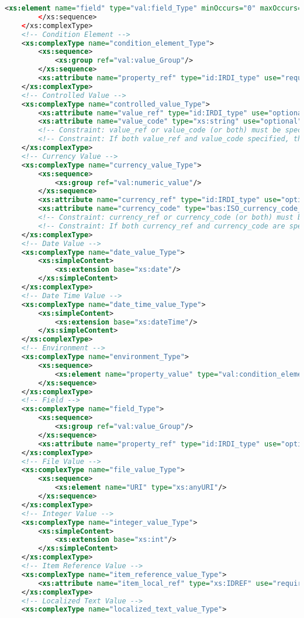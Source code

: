 \begin{lstlisting}[caption=value.xsd, language=XML, label=lst:value_xsd]
			<xs:element name="field" type="val:field_Type" minOccurs="0" maxOccurs="unbounded"/>
		</xs:sequence>
	</xs:complexType>
	<!-- Condition Element -->
	<xs:complexType name="condition_element_Type">
		<xs:sequence>
			<xs:group ref="val:value_Group"/>
		</xs:sequence>
		<xs:attribute name="property_ref" type="id:IRDI_type" use="required"/>
	</xs:complexType>
	<!-- Controlled Value -->
	<xs:complexType name="controlled_value_Type">
		<xs:attribute name="value_ref" type="id:IRDI_type" use="optional"/>
		<xs:attribute name="value_code" type="xs:string" use="optional"/>
		<!-- Constraint: value_ref or value_code (or both) must be specified. -->
		<!-- Constraint: If both value_ref and value_code specified, they must denote the same concept. -->
	</xs:complexType>
	<!-- Currency Value -->
	<xs:complexType name="currency_value_Type">
		<xs:sequence>
			<xs:group ref="val:numeric_value"/>
		</xs:sequence>
		<xs:attribute name="currency_ref" type="id:IRDI_type" use="optional"/>
		<xs:attribute name="currency_code" type="bas:ISO_currency_code_Type" use="optional"/>
		<!-- Constraint: currency_ref or currency_code (or both) must be specified. -->
		<!-- Constraint: If both currency_ref and currency_code are specified, they must denote the same concept. -->
	</xs:complexType>
	<!-- Date Value -->
	<xs:complexType name="date_value_Type">
		<xs:simpleContent>
			<xs:extension base="xs:date"/>
		</xs:simpleContent>
	</xs:complexType>
	<!-- Date Time Value -->
	<xs:complexType name="date_time_value_Type">
		<xs:simpleContent>
			<xs:extension base="xs:dateTime"/>
		</xs:simpleContent>
	</xs:complexType>
	<!-- Environment -->
	<xs:complexType name="environment_Type">
		<xs:sequence>
			<xs:element name="property_value" type="val:condition_element_Type" maxOccurs="unbounded"/>
		</xs:sequence>
	</xs:complexType>
	<!-- Field -->
	<xs:complexType name="field_Type">
		<xs:sequence>
			<xs:group ref="val:value_Group"/>
		</xs:sequence>
		<xs:attribute name="property_ref" type="id:IRDI_type" use="optional"/>
	</xs:complexType>
	<!-- File Value -->
	<xs:complexType name="file_value_Type">
		<xs:sequence>
			<xs:element name="URI" type="xs:anyURI"/>
		</xs:sequence>
	</xs:complexType>
	<!-- Integer Value -->
	<xs:complexType name="integer_value_Type">
		<xs:simpleContent>
			<xs:extension base="xs:int"/>
		</xs:simpleContent>
	</xs:complexType>
	<!-- Item Reference Value -->
	<xs:complexType name="item_reference_value_Type">
		<xs:attribute name="item_local_ref" type="xs:IDREF" use="required"/>
	</xs:complexType>
	<!-- Localized Text Value -->
	<xs:complexType name="localized_text_value_Type">

\end{lstlisting}
